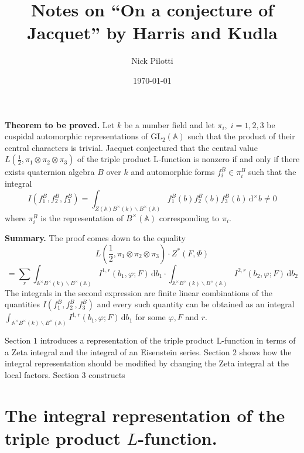 \documentclass[12pt]{article}
\title{Notes on ``On a conjecture of Jacquet'' by Harris and Kudla}
\author{Nick Pilotti}
\date{\today}
\begin{document}
\maketitle

\textbf{Theorem to be proved.} Let $k$ be a number field and let $\pi_{i}, \; i =
1, 2, 3$ be cuspidal automorphic representations of
$\text{GL}_{2}\left(\mathbb{A}\right)$ such that the product of their central
characters is trivial. Jacquet conjectured that the central value
$L\left(\frac{1}{2}, \pi_{1} \otimes \pi_2 \otimes \pi_{3}\right)$ of the triple
product L-function is nonzero if and only if there exists quaternion algebra
$B$ over $k$ and automorphic forms $f_{i}^{B} \in \pi_{i}^{B}$ such that the
integral 
%
\[I\left(f_{1}^{B}, f_{2}^{B}, f_{3}^{B}\right) = \int_{Z\left(\mathbb{A}\right)
B^{\times}\left(k\right) \backslash B^{\times}\left(\mathbb{A}\right)}^{}
f_1^{B}\left(b\right)f_2^{B}\left(b\right)f_3^{B}\left(b\right) \,
\mathrm{d}^{\times} b \neq 0\] 
%
where $\pi_{i}^{B}$ is the representation of $B^{\times}\left(\mathbb{A}\right)$
corresponding to $\pi_{i}$.

\textbf{Summary.} The proof comes down to the equality 
%
\[L\left(\frac{1}{2}, \pi_{1} \otimes \pi_{2} \otimes \pi_{3}\right) \cdot
Z^{*}\left(F, \Phi\right)\]
% 
\[= \sum_{r}^{} \int_{\mathbb{A}^{\times} B^{\times}\left(k\right) \backslash
B^{\times}\left(\mathbb{A}\right)}^{} I^{1, r}\left(b_1, \varphi; F\right) \,
\mathrm{d}b_{1} \cdot \int_{\mathbb{A}^{\times}B^{\times}\left(k\right)
\backslash B^{\times}\left(\mathbb{A}\right)}^{} I^{2,r}\left(b_{2}, \varphi; F\right) \, \mathrm{d}b_2\]
%
The integrals in the second expression are finite linear combinations of the
quantities $I\left(f_1^{B}, f_2^{B}, f_{3}^{B}\right)$ and every such quantity
can be obtained as an integral
$\int_{\mathbb{A}^{\times}B^{\times}\left(k\right) \backslash
B^{\times}\left(\mathbb{A}\right)}^{} I^{1, r}\left(b_{1}, \varphi; F\right) \,
\mathrm{d}b_{1}$ for some $\varphi, F$ and $r$.

Section $1$ introduces a representation of the triple product L-function in
terms of a Zeta integral and the integral of an Eisenstein series. Section $2$
shows how the integral representation should be modified by changing the Zeta
integral at the local factors.
Section $3$ constructs 

\section{The integral representation of the triple product $L$-function.}
\end{document}
